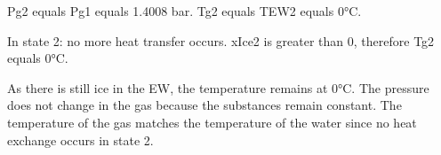 Pg2 equals Pg1 equals 1.4008 bar.  
Tg2 equals TEW2 equals 0°C.  

In state 2: no more heat transfer occurs.  
xIce2 is greater than 0, therefore Tg2 equals 0°C.  

As there is still ice in the EW, the temperature remains at 0°C.  
The pressure does not change in the gas because the substances remain constant.  
The temperature of the gas matches the temperature of the water since no heat exchange occurs in state 2.